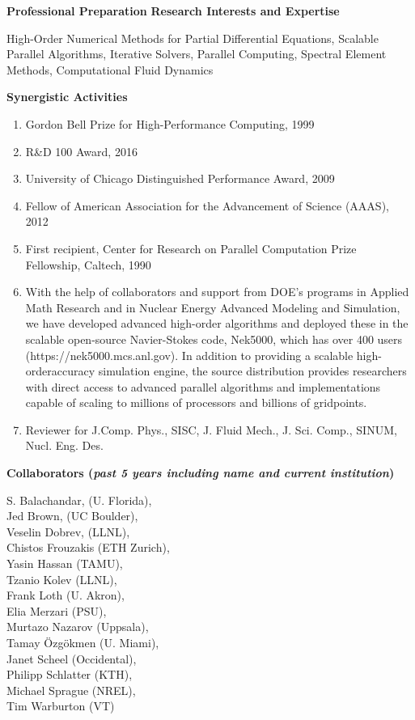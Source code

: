 \documentclass[11pt,letterpaper,english]{article}
\begin{document}
\begin{flushleft} {\bf Professional Preparation}
\vspace{-6pt}
{\bf Research Interests and Expertise}
{\parindent 16pt

High-Order Numerical Methods for Partial Differential Equations, Scalable Parallel Algorithms, Iterative Solvers, Parallel Computing, Spectral Element Methods, Computational Fluid Dynamics
}

\vspace{.04in}
{\bf Synergistic Activities}
\vspace{-6pt}
\begin{enumerate} \itemsep1pt \parskip0pt 
 \item Gordon Bell Prize for High-Performance Computing, 1999
 \item R\&D 100 Award, 2016
 \item University of Chicago Distinguished Performance Award, 2009
 \item Fellow of American Association for the Advancement of Science (AAAS), 2012
 \item First recipient, Center for Research on Parallel Computation Prize Fellowship, Caltech, 1990
 \item With the help of collaborators and support from DOE’s programs in Applied Math Research and
in Nuclear Energy Advanced Modeling and Simulation, we have developed advanced high-order
algorithms and deployed these in the scalable open-source Navier-Stokes code, Nek5000, which
has over 400 users (https://nek5000.mcs.anl.gov). In addition to providing a scalable high-orderaccuracy
simulation engine, the source distribution provides researchers with direct access to advanced
parallel algorithms and implementations capable of scaling to millions of processors and
billions of gridpoints. \\
\item Reviewer for J.Comp. Phys., SISC, J. Fluid Mech., J. Sci. Comp., SINUM, Nucl. Eng. Des. \\
\end{enumerate}

\vspace{-6pt}
{\bf Collaborators ({\emph{past 5 years including name and current institution}})}
{\parindent 16pt


 S. Balachandar, (U. Florida), \\
 Jed Brown, (UC Boulder), \\
 Veselin Dobrev, (LLNL), \\
 Chistos Frouzakis (ETH Zurich), \\
 Yasin Hassan (TAMU),  \\
 Tzanio Kolev (LLNL),  \\
 Frank Loth (U. Akron), \\
 Elia Merzari (PSU), \\
 Murtazo Nazarov (Uppsala), \\
 Tamay \"Ozg\"okmen (U. Miami),  \\
 Janet Scheel (Occidental), \\
 Philipp Schlatter (KTH), \\
 Michael Sprague (NREL), \\
 Tim Warburton (VT) \\
 }


\end{flushleft}
\end{document}
